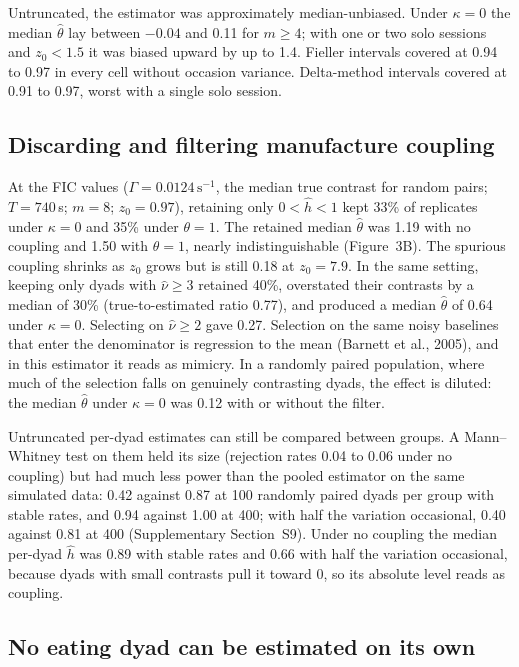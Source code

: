 \documentclass[12pt]{article}
\begin{document}
Untruncated, the estimator was approximately median-unbiased. Under $\kappa=0$ the
median $\hat\theta$ lay between $-0.04$ and 0.11 for $m\geq4$; with one or two
solo sessions and $z_0<1.5$ it was biased upward by up to 1.4. Fieller intervals covered at 0.94 to 0.97 in every cell without occasion
variance. Delta-method intervals covered at 0.91 to
0.97, worst with a single solo session.

\subsection*{Discarding and filtering manufacture coupling}

At the FIC values ($\Gamma=0.0124\,\mathrm{s}^{-1}$, the median true contrast for
random pairs; $T=740$\,s; $m=8$; $z_0=0.97$), retaining only $0<\hat h<1$ kept
33\% of replicates under $\kappa=0$ and 35\% under $\theta=1$. The retained median
$\hat\theta$ was 1.19 with no coupling and 1.50 with $\theta=1$, nearly
indistinguishable (Figure~3B). The spurious coupling shrinks as $z_0$ grows but is
still 0.18 at $z_0=7.9$. In the same setting, keeping only dyads with
$\hat\nu\geq3$ retained 40\%, overstated their contrasts by a median of 30\%
(true-to-estimated ratio 0.77), and produced a median $\hat\theta$ of 0.64 under
$\kappa=0$. Selecting on $\hat\nu\geq2$ gave 0.27. Selection on the same noisy
baselines that enter the denominator is regression to the mean (Barnett et al., 2005), and in this estimator it reads as mimicry. In a randomly
paired population, where much of the selection falls on genuinely contrasting
dyads, the effect is diluted: the median $\hat\theta$ under $\kappa=0$ was 0.12
with or without the filter.

Untruncated per-dyad estimates can still be compared between groups. A
Mann--Whitney test on them held its size (rejection rates 0.04 to 0.06 under no
coupling) but had much less power than the pooled estimator on the same simulated
data: 0.42 against 0.87 at 100 randomly paired dyads per group with stable rates,
and 0.94 against 1.00 at 400; with half the variation occasional, 0.40 against
0.81 at 400 (Supplementary Section~S9). Under no coupling the median per-dyad
$\hat h$ was 0.89 with stable rates and 0.66 with half the variation occasional,
because dyads with small contrasts pull it toward 0, so its absolute level reads as
coupling.

\subsection*{No eating dyad can be estimated on its own}
\end{document}
